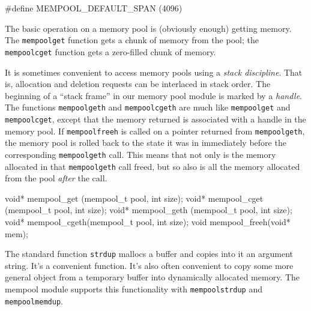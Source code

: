 \nwendcode{}\nwdocspar

\nwenddocs{}\endmoddef
#define MEMPOOL_DEFAULT_SPAN (4096)

\nwendcode{}\nwdocspar

The basic operation on a memory pool is (obviously enough)
getting memory.  The {\tt{}mempool{}get} function gets a chunk
of memory from the pool; the {\tt{}mempool{}cget} function gets
a zero-filled chunk of memory.

It is sometimes convenient to access memory pools using a
\emph{stack discipline}.  That is, allocation and deletion
requests can be interlaced in stack order.  The beginning
of a ``stack frame'' in our memory pool module is marked
by a \emph{handle}.  The functions {\tt{}mempool{}geth} and
{\tt{}mempool{}cgeth} are much like {\tt{}mempool{}get} and
{\tt{}mempool{}cget}, except that the memory returned is associated
with a handle in the memory pool.  If {\tt{}mempool{}freeh} is
called on a pointer returned from {\tt{}mempool{}geth}, the memory
pool is rolled back to the state it was in immediately before
the corresponding {\tt{}mempool{}geth} call.  This means that not
only is the memory allocated in that {\tt{}mempool{}geth} call
freed, but so also is all the memory allocated from the pool
\emph{after} the call.

\nwenddocs{}\plusendmoddef
void* mempool_get  (mempool_t pool, int size);
void* mempool_cget (mempool_t pool, int size);
void* mempool_geth (mempool_t pool, int size);
void* mempool_cgeth(mempool_t pool, int size);
void  mempool_freeh(void* mem);

\nwendcode{}\nwdocspar

The standard function {\tt{}strdup} mallocs a buffer and copies
into it an argument string.  It's a convenient function. %
It's also often convenient to copy some more general object %
from a temporary buffer into dynamically allocated memory.
The mempool module supports this functionality with
{\tt{}mempool{}strdup} and {\tt{}mempool{}memdup}.


